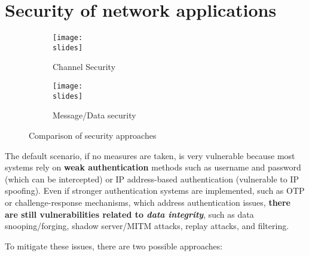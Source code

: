 \chapter{Security of network applications}

\begin{figure}[h]
    \centering
    \begin{subfigure}{0.45\textwidth}
        \centering
        \texttt{[image: \\slides]}
        \caption{Channel Security}
        \label{fig:channel-security}
    \end{subfigure}
    \hfill
    \begin{subfigure}{0.45\textwidth}
        \centering
        \texttt{[image: \\slides]}
        \caption{Message/Data security}
        \label{fig:message-security}
    \end{subfigure}
    \caption{Comparison of security approaches}
    \label{fig:security_comparison}
\end{figure}

The default scenario, if no measures are taken, is very vulnerable because most systems rely on \textbf{weak authentication} methods such as username and password (which can be intercepted) or IP address-based authentication (vulnerable to IP spoofing). Even if stronger authentication systems are implemented, such as OTP or challenge-response mechanisms, which address authentication issues, \textbf{there are still vulnerabilities related to \emph{data integrity}}, such as data snooping/forging, shadow server/MITM attacks, replay attacks, and filtering.


To mitigate these issues, there are two possible approaches:

